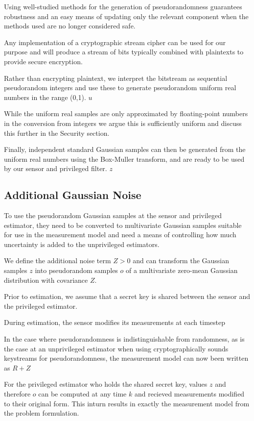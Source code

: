 \documentclass[conference]{IEEEtran}
\theoremstyle{definition}
\theoremstyle{definition}
\theoremstyle{remark}
\begin{document}
Using well-studied methods for the generation of pseudorandomness guarantees robustness and an easy means of updating only the relevant component when the methods used are no longer considered safe.

Any implementation of a cryptographic stream cipher can be used for our purpose and will produce a stream of bits typically combined with plaintexts to provide secure encryption.

Rather than encrypting plaintext, we interpret the bitstream as sequential pseudorandom integers and use these to generate pseudorandom uniform real numbers in the range (0,1). $u$

While the uniform real samples are only approximated by floating-point numbers in the conversion from integers we argue this is sufficiently uniform and discuss this further in the Security section.

Finally, independent standard Gaussian samples can then be generated from the uniform real numbers using the Box-Muller transform, and are ready to be used by our sensor and privileged filter. $z$

\subsection{Additional Gaussian Noise}
To use the pseudorandom Gaussian samples at the sensor and privileged estimator, they need to be converted to multivariate Gaussian samples suitable for use in the measurement model and need a means of controlling how much uncertainty is added to the unprivileged estimators.

We define the additional noise term $Z>0$ and can transform the Gaussian samples $z$ into pseudorandom samples $o$ of a multivariate zero-mean Gaussian distribution with covariance $Z$.

Prior to estimation, we assume that a secret key is shared between the sensor and the privileged estimator.

During estimation, the sensor modifies its measurements at each timestep

In the case where pseudorandomness is indistinguishable from randomness, as is the case at an unprivileged estimator when using cryptographically sounds keystreams for pseudorandomness, the measurement model can now been written as $R+Z$

For the privileged estimator who holds the shared secret key, values $z$ and therefore $o$ can be computed at any time $k$ and recieved measurements modified to their original form. This inturn results in exactly the measurement model from the problem formulation.
\end{document}
